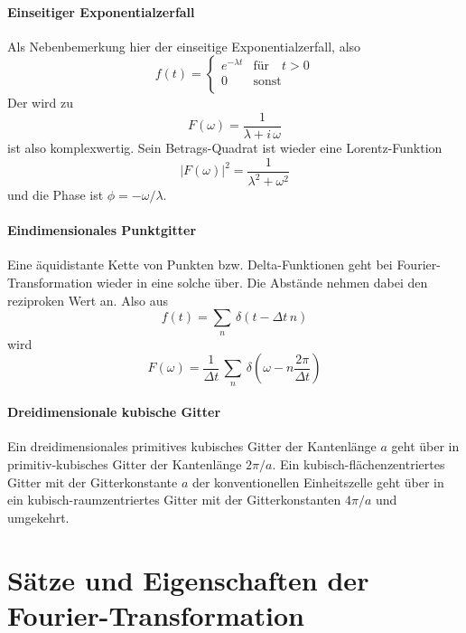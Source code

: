 \paragraph{Einseitiger Exponentialzerfall} Als Nebenbemerkung hier der einseitige Exponentialzerfall, also
\begin{equation}
 f(t) = \left\{ \begin{array}{ll}
e^{- \lambda t } & \text{für} \quad t > 0 \\
 0 & \text{sonst} \\
 \end{array}
 \right.
\end{equation}
Der wird zu
\begin{equation}
 F(\omega) = \frac{1}{\lambda + i \, \omega}
\end{equation}
ist also komplexwertig. Sein Betrags-Quadrat ist wieder eine Lorentz-Funktion
\begin{equation}
| F(\omega)|^2 = \frac{1}{\lambda^2 +  \omega^2}
\end{equation}
und die Phase ist $\phi = - \omega / \lambda$.

\paragraph{Eindimensionales Punktgitter} Eine äquidistante Kette von Punkten bzw. Delta-Funktionen geht bei Fourier-Transformation wieder in eine solche über. Die Abstände nehmen dabei den reziproken Wert an. Also aus
\begin{equation}
 f(t) = \sum_n \, \delta (t - \Delta t \, n)
\end{equation}
wird
\begin{equation}
 F(\omega) = \frac{1}{\Delta t} \, \sum_n \, \delta \left(\omega - n\frac{2 \pi}{\Delta t} \right)
\end{equation}


\paragraph{Dreidimensionale kubische Gitter} Ein dreidimensionales primitives kubisches Gitter der Kantenlänge $a$ geht über in primitiv-kubisches Gitter der Kantenlänge $2 \pi/a$. Ein kubisch-flächenzentriertes Gitter mit der Gitterkonstante $a$ der konventionellen Einheitszelle geht über in ein kubisch-raumzentriertes Gitter mit der Gitterkonstanten $4 \pi / a$ und umgekehrt. 


\section{Sätze und Eigenschaften der Fourier-Transformation}

